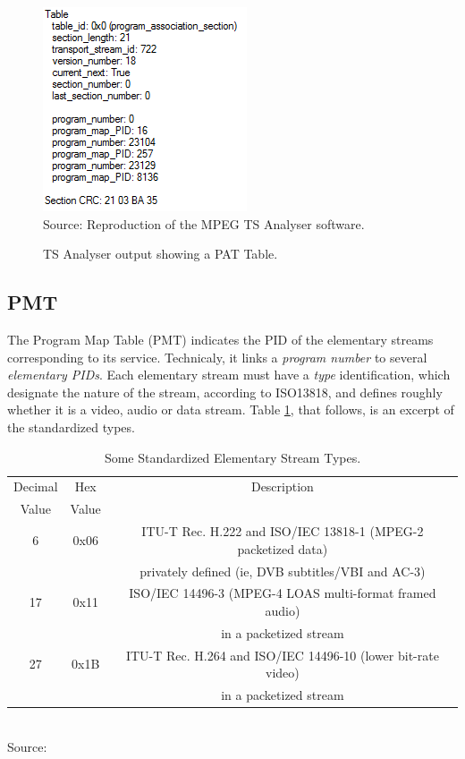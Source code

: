 \documentclass[
	12pt,				%
	openright,			%
	twoside,			%
	a4paper,			%
	brazil,
	french,				%
	english
	]{abntex2}
\begin{document}
\begin{figure}[!hb]
\centering
\caption{TS Analyser output showing a PAT Table.}
\includegraphics[width=0.4\linewidth]{figuras/TSAnalyser_close_PAT.png}
\\Source: Reproduction of the MPEG TS Analyser software.
\label{fig:TSAnalyser_close_PAT}
\end{figure}

\subsection{PMT}

The Program Map Table (PMT) indicates the PID of the elementary streams corresponding to its service. Technicaly, it links a \textit{program number} to several \textit{elementary PIDs}. Each elementary stream must have a \textit{type} identification, which designate the nature of the stream, according to ISO13818, and defines roughly whether it is a video, audio or data stream. Table \ref{tab_ISOESTypes}, that follows, is an excerpt of the standardized types.

\begin{table}[!htpd]
\caption{Some Standardized Elementary Stream Types.}
\begin{center}
\begin{tabular}{|c|c|c|}
\hline
Decimal & Hex & Description \\
Value & Value & \\
\hline
6 & 0x06 & ITU-T Rec. H.222 and ISO/IEC 13818-1 (MPEG-2 packetized data)\\
 & & privately defined (ie, DVB subtitles/VBI and AC-3)\\
 \hline
17 & 0x11 & ISO/IEC 14496-3 (MPEG-4 LOAS multi-format framed audio)\\
 & & in a packetized stream \\
 \hline
27 & 0x1B & ITU-T Rec. H.264 and ISO/IEC 14496-10 (lower bit-rate video)\\
 & & in a packetized stream \\
\hline
\end{tabular}
\label{tab_ISOESTypes}
\\Source: \cite{ISOESTypes}
\end{center}
\end{table}
\end{document}

